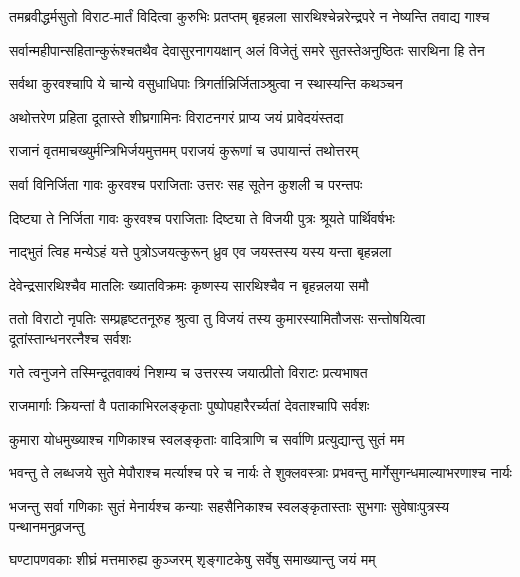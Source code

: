 \twolineshloka
{तमब्रवीद्धर्मसुतो विराट-मार्तं विदित्वा कुरुभिः प्रतप्तम्}
{बृहन्नला सारथिश्चेन्नरेन्द्रपरे न नेष्यन्ति तवाद्य गाश्च}


\twolineshloka
{सर्वान्महीपान्सहितान्कुरूंश्चतथैव देवासुरनागयक्षान्}
{अलं विजेतुं समरे सुतस्तेअनुष्ठितः सारथिना हि तेन}


\twolineshloka
{सर्वथा कुरवश्चापि ये चान्ये वसुधाधिपाः}
{त्रिगर्तान्निर्जिताञ्श्रुत्वा न स्थास्यन्ति कथञ्चन}



\twolineshloka
{अथोत्तरेण प्रहिता दूतास्ते शीघ्रगामिनः}
{विराटनगरं प्राप्य जयं प्रावेदयंस्तदा}


\twolineshloka
{राजानं वृतमाचख्युर्मन्त्रिभिर्जयमुत्तमम्}
{पराजयं कुरूणां च उपायान्तं तथोत्तरम्}


\twolineshloka
{सर्वा विनिर्जिता गावः कुरवश्च पराजिताः}
{उत्तरः सह सूतेन कुशली च परन्तपः}




\twolineshloka
{दिष्ट्या ते निर्जिता गावः कुरवश्च पराजिताः}
{दिष्ट्या ते विजयी पुत्रः श्रूयते पार्थिवर्षभः}


\twolineshloka
{नाद्भुतं त्विह मन्येऽहं यत्ते पुत्रोऽजयत्कुरून्}
{ध्रुव एव जयस्तस्य यस्य यन्ता बृहन्नला}


\twolineshloka
{देवेन्द्रसारथिश्चैव मातलिः ख्यातविक्रमः}
{कृष्णस्य सारथिश्चैव न बृहन्नलया समौ}



\threelineshloka
{ततो विराटो नृपतिः सम्प्रहृष्टतनूरुह}
{श्रुत्वा तु विजयं तस्य कुमारस्यामितौजसः}
{सन्तोषयित्वा दूतांस्तान्धनरत्नैश्च सर्वशः}


\twolineshloka
{गते त्वनुजने तस्मिन्दूतवाक्यं निशम्य च}
{उत्तरस्य जयात्प्रीतो विराटः प्रत्यभाषत}


\twolineshloka
{राजमार्गाः क्रियन्तां वै पताकाभिरलङ्कृताः}
{पुष्पोपहारैरर्च्यतां देवताश्चापि सर्वशः}


\twolineshloka
{कुमारा योधमुख्याश्च गणिकाश्च स्वलङ्कृताः}
{वादित्राणि च सर्वाणि प्रत्युद्यान्तु सुतं मम}


\twolineshloka
{भवन्तु ते लब्धजये सुते मेपौराश्च मर्त्याश्च परे च नार्यः}
{ते शुक्लवस्त्राः प्रभवन्तु मार्गेसुगन्धमाल्याभरणाश्च नार्यः}


\twolineshloka
{भजन्तु सर्वा गणिकाः सुतं मेनार्यश्च कन्याः सहसैनिकाश्च}
{स्वलङ्कृतास्ताः सुभगाः सुवेषाःपुत्रस्य पन्थानमनुव्रजन्तु}


\twolineshloka
{घण्टापणवकाः शीघ्रं मत्तमारुह्य कुञ्जरम्}
{शृङ्गाटकेषु सर्वेषु समाख्यान्तु जयं मम्}


